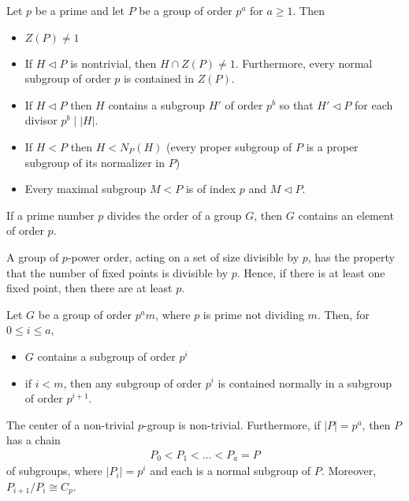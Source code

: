 \documentclass{memoir}
\begin{document}
\begin{thm}
	Let \(p\) be a prime and let \(P\) be a group of order \(p^{a}\) for \(a\geq 1\). Then
	\begin{itemize}
		\item \(Z(P) \neq 1\) 
		\item If \(H \triangleleft P\) is nontrivial, then \(H\cap Z(P) \neq 1\). Furthermore, every normal subgroup of order \(p\) is contained in \(Z(P)\).
		\item If \(H \triangleleft P\) then \(H\) contains a subgroup \(H'\) of order \(p^{b}\) so that \(H' \triangleleft P\) for each divisor \(p^{b}\mid \left| H \right| \).
		\item If \(H<P\) then \(H< N_P(H)\) (every proper subgroup of \(P\) is a proper subgroup of its normalizer in \(P\))
		\item Every maximal subgroup \(M<P\) is of index \(p\) and \(M \triangleleft P\).
	\end{itemize}
\end{thm}

\begin{thm}
	If a prime number \(p\) divides the order of a group \(G\), then \(G\) contains an element of order \(p\).
\end{thm}
A group of \(p\)-power order, acting on a set of size divisible by \(p\), has the property that the number of fixed points is divisible by \(p\). Hence, if there is at least one fixed point, then there are at least \(p\).

\begin{thm}
	Let \(G\) be a group of order \(p^{a}m\), where \(p\) is prime not dividing \(m\). Then, for \(0\leq i\leq a\),
	\begin{itemize}
		\item \(G\) contains a subgroup of order \(p^{i}\) 
		\item if \(i<m\), then any subgroup of order \(p^{i}\) is contained normally in a subgroup of order \(p^{i+1}\).
	\end{itemize}
\end{thm}

\begin{thm}
	The center of a non-trivial \(p\)-group is non-trivial. Furthermore, if \(\left| P \right| = p^{a}\), then \(P\) has a chain
	\begin{align*}
		P_0<P_1<\ldots<P_a=P
	\end{align*}
	of subgroups, where \(\left| P_i \right| =p^{i}\) and each is a normal subgroup of \(P\). Moreover, \(P_{i+1} / P_i \cong C_p\).
\end{thm}
\end{document}
